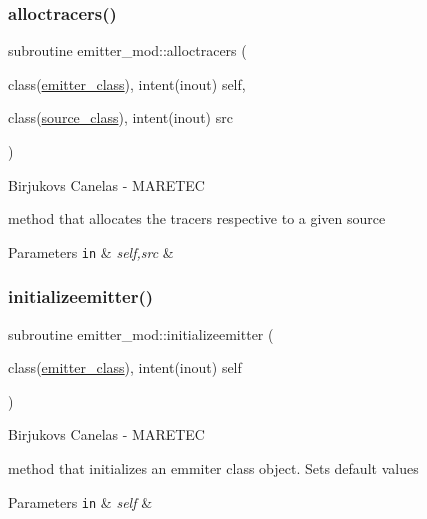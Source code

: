 \subsubsection{\texorpdfstring{alloctracers()}{alloctracers()}}
{\footnotesize\ttfamily subroutine emitter\+\_\+mod\+::alloctracers (\begin{DoxyParamCaption}\item[{class(\hyperlink{structemitter__mod_1_1emitter__class}{emitter\+\_\+class}), intent(inout)}]{self,  }\item[{class(\hyperlink{structsources__mod_1_1source__class}{source\+\_\+class}), intent(inout)}]{src }\end{DoxyParamCaption})\hspace{0.3cm}{\ttfamily [private]}}



Birjukovs Canelas -\/ M\+A\+R\+E\+T\+EC 

method that allocates the tracers respective to a given source 
\begin{DoxyParams}[1]{Parameters}
\mbox{\tt in}  & {\em self,src} & \\
\hline
\end{DoxyParams}
\mbox{\label{namespaceemitter__mod_a6376ad0f8e1739b29caf672aa0750373}} 
\subsubsection{\texorpdfstring{initializeemitter()}{initializeemitter()}}
{\footnotesize\ttfamily subroutine emitter\+\_\+mod\+::initializeemitter (\begin{DoxyParamCaption}\item[{class(\hyperlink{structemitter__mod_1_1emitter__class}{emitter\+\_\+class}), intent(inout)}]{self }\end{DoxyParamCaption})\hspace{0.3cm}{\ttfamily [private]}}



Birjukovs Canelas -\/ M\+A\+R\+E\+T\+EC 

method that initializes an emmiter class object. Sets default values 
\begin{DoxyParams}[1]{Parameters}
\mbox{\tt in}  & {\em self} & \\
\hline
\end{DoxyParams}
\mbox{\label{namespaceemitter__mod_ad89dfc083eae7362441c353225a74ebc}} 
